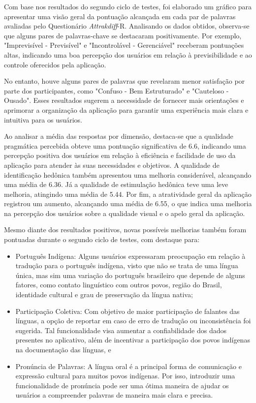 Com base nos resultados do segundo ciclo de testes, foi elaborado um gráfico para apresentar uma visão geral da pontuação alcançada em cada par de palavras avaliadas pelo Questionário \textit{Attrakdiff}-R. Analisando os dados obtidos, observa-se que alguns pares de palavras-chave 
se destacaram positivamente. Por exemplo, "Imprevisível - Previsível" e "Incontrolável - Gerenciável" receberam pontuações altas, indicando uma boa percepção dos usuários em relação à previsibilidade e ao controle oferecidos pela aplicação.

No entanto, houve alguns pares de palavras que revelaram menor satisfação por parte dos participantes, como "Confuso - Bem Estruturado" e "Cauteloso - Ousado". Esses resultados sugerem a necessidade de fornecer mais orientações e aprimorar a organização da aplicação 
para garantir uma experiência mais clara e intuitiva para os usuários.

Ao analisar a média das respostas por dimensão, destaca-se que a qualidade pragmática percebida obteve uma pontuação significativa de 6.6, indicando uma percepção positiva dos usuários em relação à eficiência e facilidade de uso da aplicação para atender às suas necessidades 
e objetivos. A qualidade de identificação hedônica também apresentou uma melhoria considerável, alcançando uma média de 6.36. Já a qualidade de estimulação hedônica teve uma leve melhoria, atingindo uma média de 5.44. Por fim, a atratividade geral da aplicação registrou um aumento, 
alcançando uma média de 6.55, o que indica uma melhoria na percepção dos usuários sobre a qualidade visual e o apelo geral da aplicação.

Mesmo diante dos resultados positivos, novas possíveis melhorias também foram pontuadas durante o segundo ciclo de testes, com destaque para:

\begin{itemize}
	\item Português Indígena: Alguns usuários expressaram preocupação em relação à tradução para o português indígena, visto que não se trata de uma língua única, mas sim uma variação do português brasileiro que depende de alguns fatores, como contato linguístico com outros 
	povos, região do Brasil, identidade cultural e grau de preservação da língua nativa;
	\item Participação Coletiva: Com objetivo de maior participação de falantes das línguas, a opção de reportar em caso de erro de tradução ou inconsistência foi sugerida. Tal funcionalidade visa aumentar a confiabilidade dos dados presentes no aplicativo, além de incentivar a 
	participação dos povos indígenas na documentação das línguas, e
	\item Pronúncia de Palavras: A língua oral é a principal forma de comunicação e expressão cultural para muitos povos indígenas. Por isso, introduzir uma funcionalidade de pronúncia pode ser uma ótima maneira de ajudar os usuários a compreender palavras de maneira mais clara 
	e precisa.
\end{itemize}

